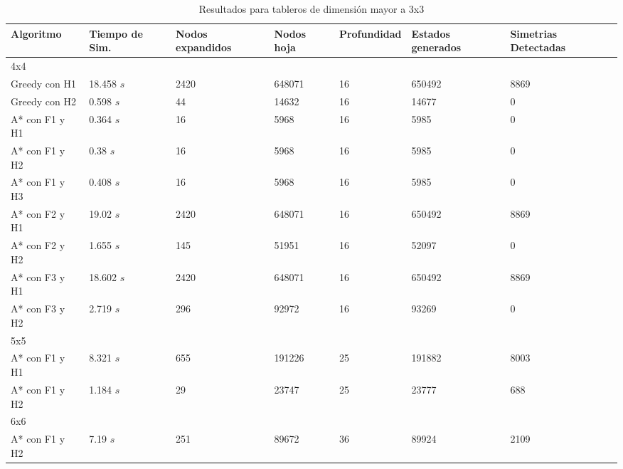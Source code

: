 \documentclass[11pt,twocolumn]{article}
\begin{document}
          \begin{table}[htdp]
        \caption{Resultados para tableros de dimensión mayor a 3x3}
                \begin{center}
        			\begin{tabular}{|C{3cm}|C{2cm}|C{2cm}|C{2cm}|C{1.5cm}|C{2cm}|C{2cm}|} \hline
    					Algoritmo & Tiempo de Sim. & Nodos expandidos & Nodos hoja & Profundidad & Estados generados & Simetrias Detectadas \\ \hline\hline
                        4x4  & & & & & & \\ \hline
                        Greedy con H1 & 18.458 $s$ & 2420 & 648071 & 16 & 650492 & 8869  \\ \hline
                        Greedy con H2 & 0.598 $s$ & 44 & 14632 & 16 & 14677 & 0  \\ \hline
                        A* con F1 y H1 & 0.364 $s$ & 16 & 5968 & 16 & 5985 & 0  \\ \hline
                        A* con F1 y H2 & 0.38 $s$ & 16 & 5968 & 16 & 5985 & 0  \\ \hline
                        A* con F1 y H3 & 0.408 $s$ & 16 & 5968 & 16 & 5985 & 0  \\ \hline
                        A* con F2 y H1 & 19.02 $s$ & 2420 & 648071 & 16 & 650492 & 8869  \\ \hline
                        A* con F2 y H2 & 1.655 $s$ & 145 & 51951 & 16 & 52097 & 0  \\ \hline
                        A* con F3 y H1 & 18.602 $s$ & 2420 & 648071 & 16 & 650492 & 8869  \\ \hline
                        A* con F3 y H2 & 2.719 $s$ & 296 & 92972 & 16 & 93269 & 0  \\ \hline
                        5x5 & & & & & & \\ \hline
                        A* con F1 y H1 & 8.321 $s$ & 655 & 191226 & 25 & 191882 & 8003  \\ \hline
                        A* con F1 y H2 & 1.184 $s$ & 29 & 23747 & 25 & 23777 & 688   \\ \hline
                        6x6 & & & & & & \\ \hline
                        A* con F1 y H2 & 7.19 $s$ & 251 & 89672 & 36 & 89924 & 2109 \\ \hline
    				\end{tabular}
    			\end{center}
                \label{table:4x4}
    	\end{table}
\end{document}

